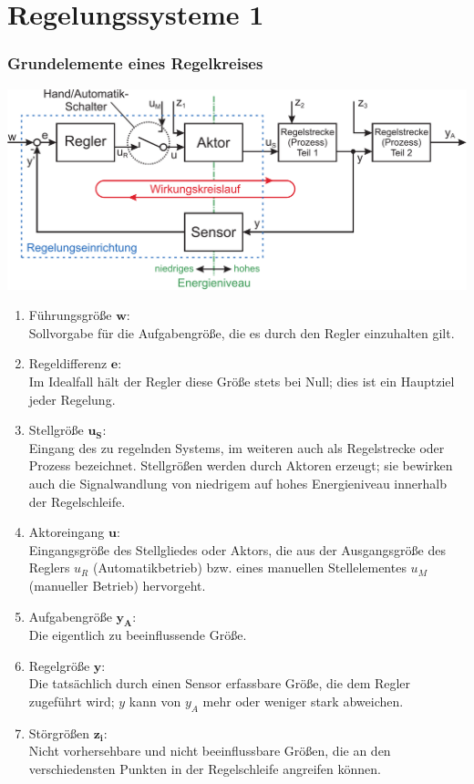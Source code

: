 \documentclass[a4paper,twocolumn,10pt]{article}
\begin{document}
\tableofcontents
\cleardoublepage

\part{Regelungssysteme 1}

\section{Grundelemente eines Regelkreises}
\includegraphics[width=0.95\columnwidth]{Grafiken/Grundelemente_Regelkreis}
\begin{enumerate}[label=$\bullet$]
\item Führungsgröße $\mathbf{w}$:\\
Sollvorgabe für die Aufgabengröße, die es durch den Regler einzuhalten gilt.
\item Regeldifferenz $\mathbf{e}$:\\
Im Idealfall hält der Regler diese Größe stets bei Null; dies ist ein Hauptziel jeder Regelung.
\item Stellgröße $\mathbf{u_S}$:\\
Eingang des zu regelnden Systems, im weiteren auch als Regelstrecke oder Prozess bezeichnet. Stellgrößen werden durch Aktoren erzeugt; sie bewirken auch die Signalwandlung von niedrigem auf hohes Energieniveau innerhalb der Regelschleife.
\item Aktoreingang $\mathbf{u}$:\\
Eingangsgröße des Stellgliedes oder Aktors, die aus der Ausgangsgröße des Reglers $u_R$ (Automatikbetrieb) bzw. eines manuellen Stellelementes $u_M$ (manueller Betrieb) hervorgeht.
\item Aufgabengröße $\mathbf{y_A}$:\\
Die eigentlich zu beeinflussende Größe.
\item Regelgröße $\mathbf{y}$:\\
Die tatsächlich durch einen Sensor erfassbare Größe, die dem Regler zugeführt wird; $y$ kann von $y_A$ mehr oder weniger stark abweichen.
\item Störgrößen $\mathbf{z_i}$:\\
Nicht vorhersehbare und nicht beeinflussbare Größen, die an den verschiedensten Punkten in der Regelschleife angreifen können.
\end{enumerate}
\end{document}
